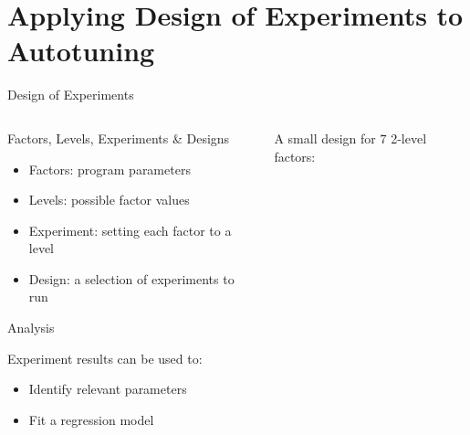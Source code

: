 \documentclass[10pt, compress, aspectratio=169, xcolor={table,usenames,dvipsnames}]{beamer}
\begin{document}
\section{Applying Design of Experiments to Autotuning}
\label{sec:orge88bfe1}
\begin{frame}[label={sec:orgcc2d222}]{Design of Experiments}
\begin{columns}
\begin{column}{0.5\columnwidth}
\begin{block}{Factors, Levels, Experiments \& Designs}
\vspace{.2cm}

\begin{itemize}
\item \alert{Factors}: program \alert{parameters}
\item \alert{Levels}: possible factor \alert{values}
\item \alert{Experiment}: setting each factor to a level
\item \alert{Design}: a \alert{selection} of experiments to \alert{run}
\end{itemize}

\begin{block}{Analysis}
\vspace{.2cm}

\alert{Experiment results} can be used to:

\begin{itemize}
\item Identify \alert{relevant parameters}
\item Fit a \alert{regression model}
\end{itemize}
\end{block}
\end{block}
\end{column}

\begin{column}{0.5\columnwidth}
\vspace{.4cm}

A \alert{small design} for \(7\) \alert{2-level factors}:

\vspace{.2cm}


\end{column}
\end{columns}
\end{frame}
\end{document}
